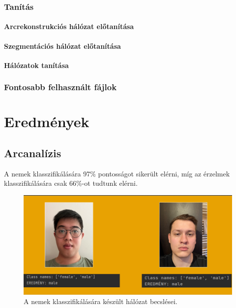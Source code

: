 \documentclass[12pt,a4]{article}
\begin{document}
    \subsubsection{Tanítás}
        \paragraph{Arcrekonstrukciós hálózat előtanítása}
        \paragraph{Szegmentációs hálózat előtanítása}
        \paragraph{Hálózatok tanítása}
    \subsubsection{Fontosabb felhasznált fájlok}
    
    \section{Eredmények}
 	      \subsection{Arcanalízis}
            A nemek klasszifikálására 97\% pontosságot sikerült elérni, míg az érzelmek klasszifikálására csak 66\%-ot tudtunk elérni.
    
                \begin{figure}[h!]	
            		\centering
            		\includegraphics[width=1\linewidth]{gender}
                    \caption{  A nemek klasszifikálására készült hálózat becslései.}
                    \label{fig:gender}
            	\end{figure}
            
\end{document}
